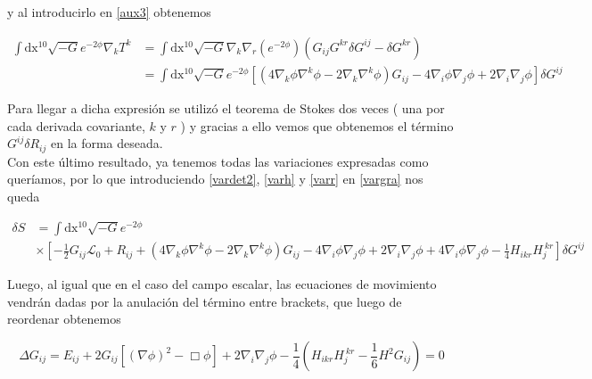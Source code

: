 \documentclass{article}
\numberwithin{equation}{section}
\begin{document}
y al introducirlo en \ref{aux3} obtenemos

\begin{equation*}
\begin{aligned}
\int\mathrm{dx^{10}} \sqrt{-G}e^{-2\phi} \nabla_k T^k &= \int\mathrm{dx^{10}} \sqrt{-G} \nabla_k \nabla_r \left(e^{-2\phi}\right) \left(G_{ij}G^{kr} \delta G^{ij} - \delta G^{kr} \right)\\
&=\int\mathrm{dx^{10}} \sqrt{-G}e^{-2\phi} \left[ \left( 4 \nabla_k\phi \nabla^k \phi - 2 \nabla_k\nabla^k \phi \right)G_{ij} - 4\nabla_i\phi \nabla_{j}\phi + 2 \nabla_{i}\nabla_{j} \phi  \right]\delta G^{ij}
\end{aligned}
\end{equation*}

Para llegar a dicha expresión se utilizó el teorema de Stokes dos veces ( una por cada derivada covariante, $ k $ y $ r $ ) y gracias a ello vemos que obtenemos el término $ G^{ij}\delta R_{ij} $ en la forma deseada.\\
 
Con este último resultado, ya tenemos todas las variaciones expresadas como queríamos, por lo que introduciendo \ref{vardet2}, \ref{varh} y \ref{varr} en \ref{vargra} nos queda

\begin{equation*}
\begin{aligned}
\delta S &= \int\mathrm{dx^{10}}\sqrt{-G} e^{-2\phi}\\
& \times \left[ -\frac{1}{2} G_{ij}\mathscr{L}_0  + R_{ij} + \left(4 \nabla_k\phi\nabla^k\phi  -2\nabla_k\nabla^k\phi \right)G_{ij} - 4\nabla_{i}\phi \nabla_{j}\phi + 2 \nabla_{i}\nabla_{j} \phi + 4\nabla_{i}\phi \nabla_{j}\phi -   \frac{1}{4} H_{i k r}H_{j}^{ \ k r} \right] \delta G^{ij} 
\end{aligned}
\end{equation*} 
 
Luego, al igual que en el caso del campo escalar, las ecuaciones de movimiento vendrán dadas por la anulación del término entre brackets, que luego de reordenar obtenemos

\vspace{0.4cm}

\begin{boxquation}
\begin{equation*}
\Delta G_{i j} = E_{ij} + 2 G_{ij} \left[ \left(\nabla \phi\right)^2 - \Box \phi \right] + 2 \nabla_{i}\nabla_{j} \phi - \frac{1}{4} \left( H_{ikr} H_{j}^{ \ kr} - \frac{1}{6} H^2 G_{ij} \right) = 0
\end{equation*}
\end{boxquation}
\end{document}
